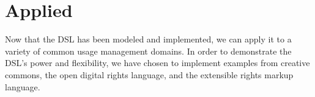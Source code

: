 \section{Applied}\label{sec:applied}
Now that the DSL has been modeled and implemented, we can apply it to a variety of common usage management domains.  In order to demonstrate the DSL's power and flexibility, we have chosen to implement examples from creative commons, the open digital rights language, and the extensible rights markup language.



